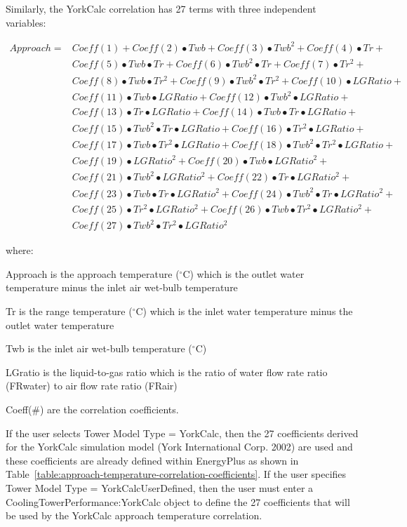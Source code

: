 Similarly, the YorkCalc correlation has 27 terms with three independent variables:

\begin{equation}
\begin{array}{rl}
Approach =& Coeff(1) + Coeff(2)•Twb + Coeff(3)•Twb^{2} + Coeff(4)•Tr + \\
 & Coeff(5)•Twb•Tr + Coeff(6)•Twb^{2}•Tr + Coeff(7)•Tr^{2} + \\
 & Coeff(8)•Twb•Tr^{2} + Coeff(9)•Twb^{2}•Tr^{2} + Coeff(10)•LGRatio + \\
 & Coeff(11)•Twb•LGRatio + Coeff(12)•Twb^{2}•LGRatio + \\
 & Coeff(13)•Tr•LGRatio + Coeff(14)•Twb•Tr•LGRatio + \\
 & Coeff(15)•Twb^{2}•Tr•LGRatio + Coeff(16)•Tr^{2}•LGRatio + \\
 & Coeff(17)•Twb•Tr^{2}•LGRatio + Coeff(18)•Twb^{2}•Tr^{2}•LGRatio + \\
 & Coeff(19)•LGRatio^{2} + Coeff(20)•Twb•LGRatio^{2} + \\
 & Coeff(21)• Twb^{2}•LGRatio^{2} + Coeff(22)•Tr•LGRatio^{2} + \\
 & Coeff(23)•Twb•Tr•LGRatio^{2} + Coeff(24)•Twb^{2}•Tr•LGRatio^{2} + \\
 & Coeff(25)•Tr^{2}•LGRatio^{2} + Coeff(26)•Twb•Tr^{2}•LGRatio^{2} + \\
 & Coeff(27)•Twb^{2}•Tr^{2}•LGRatio^{2}
\end{array}
\end{equation}

where:

Approach is the approach temperature (\(^{\circ}\)C) which is the outlet water temperature minus the inlet air wet-bulb temperature

Tr is the range temperature (\(^{\circ}\)C) which is the inlet water temperature minus the outlet water temperature

Twb is the inlet air wet-bulb temperature (\(^{\circ}\)C)

LGratio is the liquid-to-gas ratio which is the ratio of water flow rate ratio (FRwater) to air flow rate ratio (FRair)

Coeff(\#) are the correlation coefficients.

If the user selects Tower Model Type = YorkCalc, then the 27 coefficients derived for the YorkCalc simulation model (York International Corp. 2002) are used and these coefficients are already defined within EnergyPlus as shown in Table~\ref{table:approach-temperature-correlation-coefficients}. If the user specifies Tower Model Type = YorkCalcUserDefined, then the user must enter a CoolingTowerPerformance:YorkCalc object to define the 27 coefficients that will be used by the YorkCalc approach temperature correlation.

